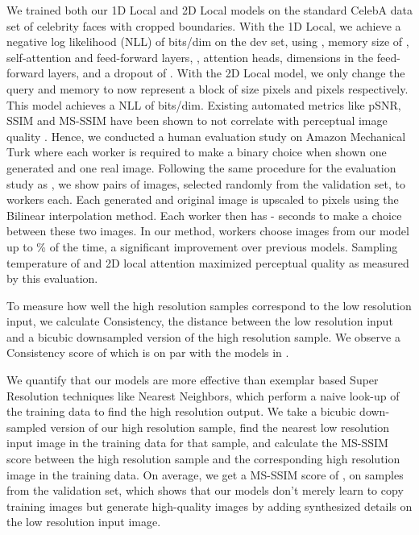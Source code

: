 \documentclass{article}
\begin{document}
We trained both our 1D Local and 2D Local models on the standard CelebA data set of celebrity faces with cropped boundaries. With the 1D Local, we achieve a negative log likelihood (NLL) of  bits/dim on the dev set, using , memory size of ,  self-attention and feed-forward layers, ,  attention heads,  dimensions in the feed-forward layers, and a dropout of . With the 2D Local model, we only change the query and memory to now represent a block of size  pixels and  pixels respectively. This model achieves a NLL of  bits/dim.
Existing automated metrics like pSNR, SSIM and MS-SSIM have been shown to not correlate with perceptual image quality \citep{PixelRecursiveSuperResolution}. Hence, we conducted a human evaluation study on Amazon Mechanical Turk where each worker is required to make a binary choice when shown one generated and one real image. Following the same procedure for the evaluation study as \cite{PixelRecursiveSuperResolution}, we show  pairs of images, selected randomly from the validation set, to  workers each. Each generated and original image is upscaled to  pixels using the Bilinear interpolation method. Each worker then has - seconds to make a choice between these two images. In our method, workers choose images from our model up to \% of the time, a significant improvement over previous models. Sampling temperature of  and 2D local attention maximized perceptual quality as measured by this evaluation.

To measure how well the high resolution samples correspond to the low resolution input, we calculate Consistency, the  distance between the low resolution input and a bicubic downsampled version of the high resolution sample. We observe a Consistency score of  which is on par with the models in \cite{PixelRecursiveSuperResolution}. 

We quantify that our models are more effective than exemplar based Super Resolution techniques like Nearest Neighbors, which perform a naive look-up of the training data to find the high resolution output. We take a bicubic down-sampled version of our high resolution sample, find the nearest low resolution input image in the training data for that sample, and calculate the MS-SSIM score between the high resolution sample and the corresponding high resolution image in the training data. On average, we get a MS-SSIM score of , on  samples from the validation set, which shows that our models don't merely learn to copy training images but generate high-quality images by adding synthesized details on the low resolution input image.
\end{document}
